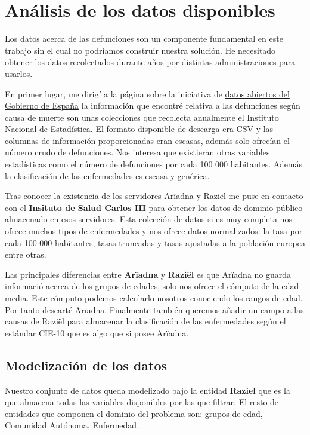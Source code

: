 \chapter{Análisis de los datos disponibles}

Los datos acerca de las defunciones son un componente fundamental en este trabajo sin
el cual no podríamos construir nuestra solución. He necesitado obtener los datos recolectados
durante años por distintas administraciones para usarlos.

En primer lugar, me dirigí a la página sobre la iniciativa de \href{https://datos.gob.es/}{datos abiertos del Gobierno de España}
la información que encontré relativa a las defunciones
según causa de muerte son unas colecciones que recolecta anualmente el Instituto
Nacional de Estadística. El formato disponible de descarga era CSV y las columnas de información
proporcionadas eran escasas, además solo ofrecían el número crudo de defunciones. Nos interesa que existieran
otras variables estadísticas como el número de defunciones por cada 100 000 habitantes. Además la clasificación de
las enfermedades es escasa y genérica.

Tras conocer la existencia de los servidores Arïadna y Raziël me puse en contacto con el \textbf{Insituto de Salud Carlos
III} para obtener los datos de dominio público almacenado en esos servidores. Esta colección de datos si es muy completa
nos ofrece muchos tipos de enfermedades y nos ofrece datos normalizados: la tasa por cada 100 000 habitantes, tasas truncadas y
tasas ajustadas a la población europea entre otras.

Las principales diferencias entre \textbf{Arïadna} y \textbf{Raziël} es que Arïadna no guarda informació acerca
de los grupos de edades, solo nos ofrece el cómputo de la edad media. Este cómputo podemos calcularlo nosotros conociendo
los rangos de edad. Por tanto descarté Arïadna.
Finalmente también queremos añadir un campo a las causas de Raziël para almacenar la clasificación de las 
enfermedades según el estándar \gls{CIE-10} que es algo que si posee Arïadna.

\section{Modelización de los datos}
Nuestro conjunto de datos queda modelizado bajo la entidad \textbf{Raziel} que es la que almacena todas las variables
disponibles por las que filtrar. El resto de entidades que componen el dominio del problema son: grupos de edad,
Comunidad Autónoma, Enfermedad.
